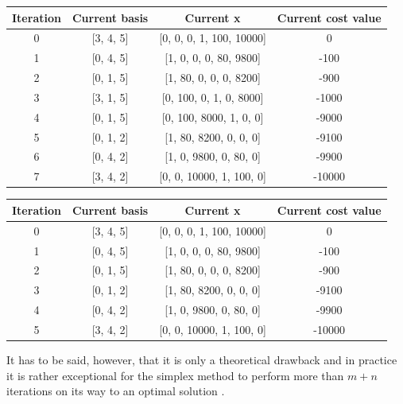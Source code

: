 \documentclass[a4paper,10 pt,titlepage,twoside]{book}
\theoremstyle{plain}
\theoremstyle{definition}
\theoremstyle{remark}
\begin{document}
\begin{table}[h]
	\begin{center}
	\begin{tabular}{|c|c|c|c|}
		\hline
		\textbf{Iteration} & \textbf{Current basis} & \textbf{Current x} & \textbf{Current cost value} \\ \hline
		0 & [3, 4, 5] & [0, 0, 0, 1, 100, 10000] & 0 \\ 
		1 & [0, 4, 5] & [1, 0, 0, 0, 80, 9800] & -100 \\
		2 & [0, 1, 5] & [1, 80, 0, 0, 0, 8200] & -900 \\
		3 & [3, 1, 5] & [0, 100, 0, 1, 0, 8000] & -1000 \\ 
		4 & [0, 1, 5] & [0, 100, 8000, 1, 0, 0] & -9000 \\ 
		5 & [0, 1, 2] & [1, 80, 8200, 0, 0, 0] & -9100 \\
		6 & [0, 4, 2] & [1, 0, 9800, 0, 80, 0] & -9900 \\ 
		7 & [3, 4, 2] & [0, 0, 10000, 1, 100, 0] & -10000 \\ \hline
	\end{tabular}
\end{center}
\end{table}

\begin{table}[h]
	\begin{center}
		\begin{tabular}{|c|c|c|c|}
			\hline
			\textbf{Iteration} & \textbf{Current basis} & \textbf{Current x} & \textbf{Current cost value} \\ \hline
			0 & [3, 4, 5] & [0, 0, 0, 1, 100, 10000] & 0 \\
			1 & [0, 4, 5] & [1, 0, 0, 0, 80, 9800] & -100 \\
			2 & [0, 1, 5] & [1, 80, 0, 0, 0, 8200] & -900 \\
			3 & [0, 1, 2] & [1, 80, 8200, 0, 0, 0] & -9100 \\
			4 & [0, 4, 2] & [1, 0, 9800, 0, 80, 0] & -9900 \\
			5 & [3, 4, 2] & [0, 0, 10000, 1, 100, 0] & -10000 \\ \hline
		\end{tabular}
	\end{center}
\end{table}

It has to be said, however, that it is only a theoretical drawback and in practice it is rather exceptional for the simplex method to perform more than $m + n$ iterations on its way to an optimal solution \cite{ComTeq}.
\\
\end{document}
